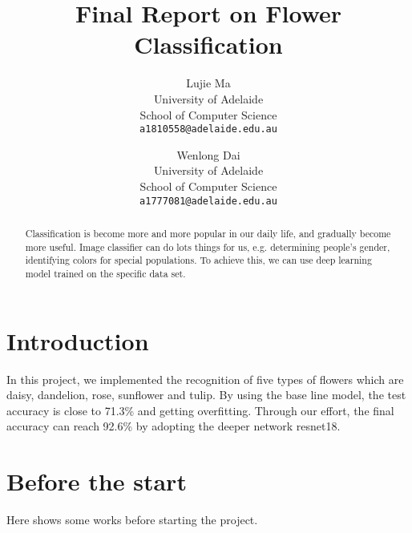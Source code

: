 \documentclass[10pt,twocolumn,letterpaper]{article}
\begin{document}
\title{Final Report on Flower Classification}

\author{Lujie Ma\\
University of Adelaide\\
School of Computer Science\\
{\tt\small a1810558@adelaide.edu.au}
\and
Wenlong Dai\\
University of Adelaide\\
School of Computer Science\\
{\tt\small a1777081@adelaide.edu.au}
}
\maketitle

\begin{abstract}
   Classification is become more and more popular in our daily life, and gradually become more useful.
   Image classifier can do lots things for us, e.g. determining people's gender, identifying colors for special populations.
   To achieve this, we can use deep learning model trained on the specific data set.
   
\end{abstract}


\section{Introduction}
In this project, we implemented the recognition of five types of flowers which are daisy, dandelion, rose, sunflower and tulip.
By using the base line model, the test accuracy is close to 71.3\% and getting overfitting.
Through our effort, the final accuracy can reach 92.6\% by adopting the deeper network resnet18.

\section{Before the start}

Here shows some works before starting the project.
\end{document}

